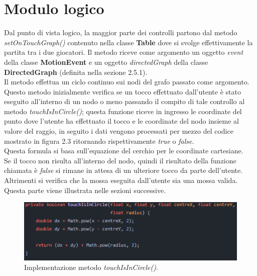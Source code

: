 \documentclass[a4paper,11pt,twoside,openright]{report}
\begin{document}
\section{Modulo logico}
Dal punto di vista logico, la maggior parte dei controlli partono dal metodo \textit{setOnTouchGraph()} contenuto nella classe \textbf{Table} dove si svolge effettivamente la partita tra i due giocatori. Il metodo riceve come argomento un oggetto \textit{event} della classe \textbf{MotionEvent} e un oggetto \textit{directedGraph} della classe \textbf{DirectedGraph} (definita nella sezione 2.5.1).\\
Il metodo effettua un ciclo continuo sui nodi del grafo passato come argomento.\\
Questo metodo inizialmente verifica se un tocco effettuato dall'utente è stato eseguito all'interno di un nodo o meno passando il compito di tale controllo al metodo \textit{touchIsInCircle()}; questa funzione riceve in ingresso le coordinate del punto dove l'utente ha effettuato il tocco e le coordinate del nodo insieme al valore del raggio, in seguito i dati vengono processati per mezzo del codice mostrato in figura 2.3 ritornando rispettivamente \textit{true} o \textit{false}.\\
Questa formula si basa sull'equazione del cerchio per le coordinate cartesiane.\\
Se il tocco non risulta all'interno del nodo, quindi il risultato della funzione chiamata è \textit{false} si rimane in attesa di un ulteriore tocco da parte dell'utente.\\
Altrimenti si verifica che la mossa eseguita dall'utente sia una mossa valida. Questa parte viene illustrata nelle sezioni successive.

\begin{figure}[h]
\includegraphics{images/touchIsInCircle.png}
\caption{Implementazione metodo \textit{touchIsInCircle()}.}
\end{figure}
\end{document}
